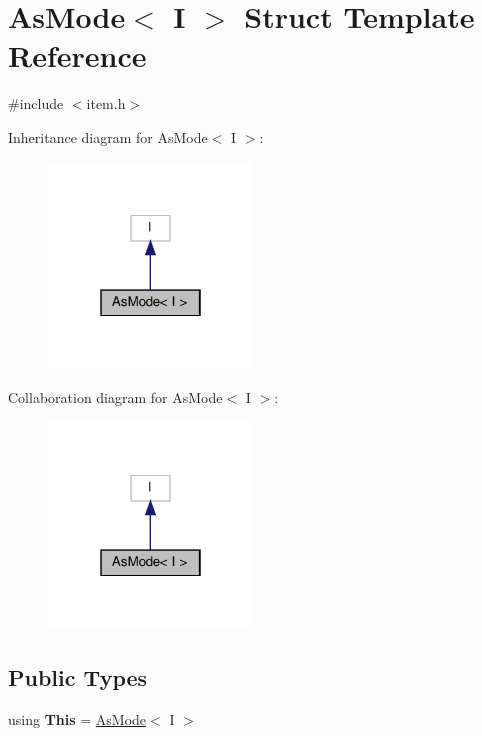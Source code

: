 \hypertarget{structAsMode}{}\section{As\+Mode$<$ I $>$ Struct Template Reference}
\label{structAsMode}


{\ttfamily \#include $<$item.\+h$>$}



Inheritance diagram for As\+Mode$<$ I $>$\+:\nopagebreak
\begin{figure}[H]
\begin{center}
\leavevmode
\includegraphics[width=154pt]{structAsMode__inherit__graph}
\end{center}
\end{figure}


Collaboration diagram for As\+Mode$<$ I $>$\+:\nopagebreak
\begin{figure}[H]
\begin{center}
\leavevmode
\includegraphics[width=154pt]{structAsMode__coll__graph}
\end{center}
\end{figure}
\subsection*{Public Types}
\begin{DoxyCompactItemize}
\item 
\mbox{\label{structAsMode_a40b38b801c92c71f62669fd54a733fc1}} 
using {\bfseries This} = \hyperlink{structAsMode}{As\+Mode}$<$ I $>$
\end{DoxyCompactItemize}
